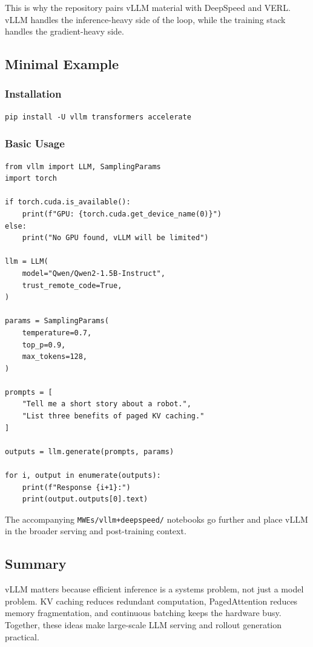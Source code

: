 \documentclass[class=article,crop=false]{standalone}
\begin{document}
This is why the repository pairs vLLM material with DeepSpeed and VERL. vLLM handles the inference-heavy side of the loop, while the training stack handles the gradient-heavy side.

\subsection{Minimal Example}
\label{sec:vllm:demo}

\subsubsection{Installation}
\begin{verbatim}
pip install -U vllm transformers accelerate
\end{verbatim}

\subsubsection{Basic Usage}
\begin{verbatim}
from vllm import LLM, SamplingParams
import torch

if torch.cuda.is_available():
    print(f"GPU: {torch.cuda.get_device_name(0)}")
else:
    print("No GPU found, vLLM will be limited")

llm = LLM(
    model="Qwen/Qwen2-1.5B-Instruct",
    trust_remote_code=True,
)

params = SamplingParams(
    temperature=0.7,
    top_p=0.9,
    max_tokens=128,
)

prompts = [
    "Tell me a short story about a robot.",
    "List three benefits of paged KV caching."
]

outputs = llm.generate(prompts, params)

for i, output in enumerate(outputs):
    print(f"Response {i+1}:")
    print(output.outputs[0].text)
\end{verbatim}

The accompanying \texttt{MWEs/vllm+deepspeed/} notebooks go further and place vLLM in the broader serving and post-training context.

\subsection{Summary}
\label{sec:vllm:summary}

vLLM matters because efficient inference is a systems problem, not just a model problem. KV caching reduces redundant computation, PagedAttention reduces memory fragmentation, and continuous batching keeps the hardware busy. Together, these ideas make large-scale LLM serving and rollout generation practical.
\end{document}

